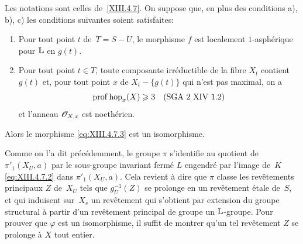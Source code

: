\setcounter{subsubsection}{3}

\begin{subproposition}
\label{XIII.4.7.4} Les notations sont celles de~\ref{XIII.4.7}. On
suppose que, en plus des conditions \textup{a), b), c)} les conditions
suivantes soient satisfaites:
\begin{enumerate}
\item[d)] Pour tout point $t$ de~$T=S-U$, le morphisme $f$ est
localement $1$-asph\'erique pour $\mathbb{L}$ en $g(t)$.
\item[e)] Pour tout point $t\in T$, toute composante irr\'eductible
de la fibre $X_t$ contient $g(t)$ et, pour tout point $x$ de
$X_t-\{g(t)\}$ qui n'est pas maximal, on a
$$
\operatorname{prof}\operatorname{hop}_x(X)\geqslant 3 \quad\textup{(SGA~2 XIV~1.2)}
$$
et l'anneau $\cal{O}_{X,x}$ est noeth\'erien.
\end{enumerate}

Alors le morphisme \eqref{eq:XIII.4.7.3} est un isomorphisme.
\end{subproposition}

Comme on l'a dit pr\'ec\'edemment, le groupe $\pi$ s'identifie au
quotient de~$\pi'_1(X_U,a)$ par le sous-groupe invariant ferm\'e $L$
engendr\'e par l'image de~$K$ \eqref{eq:XIII.4.7.2} dans
$\pi'_1(X_U,a)$. Cela revient \`a dire que $\pi$ classe les
rev\^etements principaux $Z$ de~$X_U$ tels que $g^{-1}_U(Z)$ se
prolonge en un rev\^etement \'etale de~$S$, et qui induisent sur~$X_{\bar{s}}$ un rev\^etement qui s'obtient par extension du groupe
structural \`a partir d'un rev\^etement principal de groupe un
$\mathbb{L}$-groupe. Pour prouver que $\varphi$ est un isomorphisme, il
suffit de montrer qu'un tel rev\^etement $Z$ se prolonge \`a $X$
tout entier.

